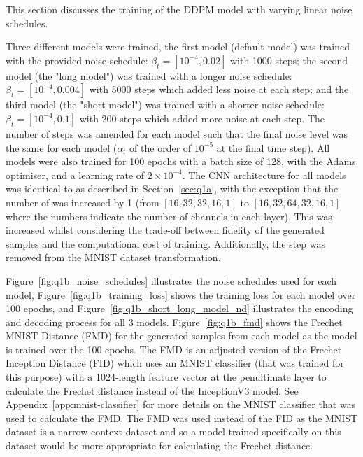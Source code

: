 This section discusses the training of the DDPM model with varying linear noise schedules.

Three different models were trained, the first model (default model) was trained with the provided noise schedule:
$\beta_{t} = [10^{-4}, 0.02]$ with 1000 steps; the second model (the "long model") was trained with a longer noise schedule:
$\beta_{t} = [10^{-4}, 0.004]$ with 5000 steps which added less noise at each step; and the third model (the "short model")
was trained with a shorter noise schedule: $\beta_{t} = [10^{-4}, 0.1]$ with 200 steps which added more noise at each step.
The number of steps was amended for each model such that the final noise level was the same for each model ($\alpha_{t}$
of the order of $10^{-5}$ at the final time step).
All models were also trained for 100 epochs with a batch size of 128, with the Adams optimiser, and a learning rate of
$2 \times 10^{-4}$.
The CNN architecture for all models was identical to as described in Section~\eqref{sec:q1a}, with the exception
that the number of  was increased by 1 (from $[16, 32, 32, 16, 1]$ to $[16, 32, 64, 32, 16, 1]$ where
the numbers indicate the number of channels in each layer).
This was increased whilst considering the trade-off between fidelity of the generated samples and the computational cost of training.
Additionally, the  step was removed from the MNIST dataset transformation.

Figure~\eqref{fig:q1b_noise_schedules} illustrates the noise schedules used for each model, Figure~\eqref{fig:q1b_training_loss}
shows the training loss for each model over 100 epochs, and Figure~\eqref{fig:q1b_short_long_model_nd} illustrates the encoding
and decoding process for all 3 models.
Figure~\eqref{fig:q1b_fmd} shows the Frechet MNIST Distance (FMD) for the generated samples from each model as the model
is trained over the 100 epochs.
The FMD is an adjusted version of the Frechet Inception Distance (FID) which uses an MNIST classifier (that was trained
for this purpose) with a 1024-length feature vector at the penultimate layer to calculate the Frechet distance instead
of the InceptionV3 model.
See Appendix~\eqref{app:mnist-classifier} for more details on the MNIST classifier that was used to calculate the FMD.
The FMD was used instead of the FID as the MNIST dataset is a narrow context dataset and so a model trained specifically on this
dataset would be more appropriate for calculating the Frechet distance.

